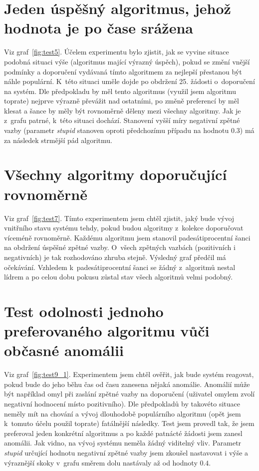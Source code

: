 \documentclass[thesis=M,czech]{FITthesis}[2014/05/07]
\begin{document}
\section{Jeden úspěšný algoritmus, jehož hodnota je po čase srážena}
Viz graf~\ref{fig:test5}. Účelem experimentu bylo zjistit, jak se vyvine situace podobná situaci výše (algoritmus mající výrazný úspěch), pokud se změní vnější podmínky a doporučení vydávaná tímto algoritmem za nejlepší přestanou být náhle populární. K~této situaci uměle dojde po obdržení 25. žádosti o~doporučení na systém. Dle předpokladu by měl tento algoritmus (využil jsem algoritmu toprate) nejprve výrazně převážit nad ostatními, po změně preferencí by měl klesat a šance by měly být rovnoměrně děleny mezi všechny algoritmy. Jak je z~grafu patrné, k~této situaci dochází. Stanovení vyšší míry negativní zpětné vazby (parametr \emph{stupid} stanoven oproti předchozímu případu na hodnotu $0.3$) má za následek strmější pád algoritmu.

\section{Všechny algoritmy doporučující rovnoměrně}
Viz graf~\ref{fig:test7}. Tímto experimentem jsem chtěl zjistit, jaký bude vývoj vnitřního stavu systému tehdy, pokud budou algoritmy z~kolekce doporučovat víceméně rovnoměrně. Každému algoritmu jsem stanovil padesátiprocentní šanci na obdržení úspěšné zpětné vazby. O~všech zpětných vazbách (pozitivních i negativních) je tak rozhodováno zhruba stejně. Výsledný graf předčil má očekávání. Vzhledem k~padesátiprocentní šanci se žádný z~algoritmů nestal lídrem a po celou dobu pokusu zůstal stav všech algoritmů velmi podobný. 

\section{Test odolnosti jednoho preferovaného algoritmu vůči občasné anomálii}
Viz graf~\ref{fig:test9_1}. Experimentem jsem chtěl ověřit, jak bude systém reagovat, pokud bude do jeho běhu čas od času zanesena nějaká anomálie. Anomálií může být například omyl při zaslání zpětné vazby na doporučení (uživatel omylem zvolí negativní hodnocení místo pozitivního). Dle předpokladů by takovéto situace neměly mít na chování a vývoj dlouhodobě populárního algoritmu (opět jsem k~tomuto účelu použil toprate) fatálnější následky. Test jsem provedl tak, že jsem preferoval jeden konkrétní algoritmus a po každé patnácté žádosti jsem zanesl anomálii. Jak vidno, na vývoj systému neměla žádný viditelný vliv. Parametr \emph{stupid} určující hodnotu negativní zpětné vazby jsem zkoušel nastavovat i výše a výraznější skoky v~grafu směrem dolu nastávaly až od hodnoty $0.4$.
\end{document}
